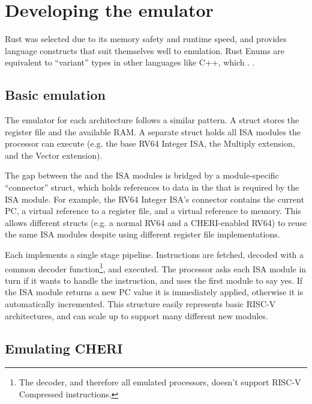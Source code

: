 \section{Developing the emulator}\label{chap:software:sec:emu}
Rust was selected due to its memory safety and runtime speed, and provides language constructs that suit themselves well to emulation.
Rust Enums are equivalent to \enquote{variant} types in other languages like C++, which \todomark{}.
.

\subsection{Basic emulation}
The emulator for each architecture follows a similar pattern.
A  struct stores the register file and the available RAM.
A separate  struct holds all ISA modules the processor can execute (e.g. the base RV64 Integer ISA, the Multiply extension, and the Vector extension).

The gap between the  and the ISA modules is bridged by a module-specific ``connector'' struct, which holds references to data in the  that is required by the ISA module.
For example, the RV64 Integer ISA's connector contains the current PC, a virtual reference to a register file, and a virtual reference to memory.
This allows different  structs (e.g. a normal RV64 and a CHERI-enabled RV64) to reuse the same ISA modules despite using different register file implementations.

Each  implements a single stage pipeline.
Instructions are fetched, decoded with a common decoder function\footnote{The decoder, and therefore all emulated processors, doesn't support RISC-V Compressed instructions.}, and executed.
The processor asks each ISA module in turn if it wants to handle the instruction, and uses the first module to say yes.
If the ISA module returns a new PC value it is immediately applied, otherwise it is automatically incremented.
This structure easily represents basic RISC-V architectures, and can scale up to support many different new modules.


\subsection{Emulating CHERI}

